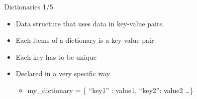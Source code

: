 \documentclass[
  8pt,
  ignorenonframetext,
]{beamer}
\providecommand{\tightlist}{%
  \setlength{\itemsep}{0pt}\setlength{\parskip}{0pt}}
\begin{document}
\begin{frame}{Dictionaries 1/5}
\protect\hypertarget{dictionaries-15}{}
\begin{itemize}[<+->]
\tightlist
\item
  Data structure that uses data in key-value pairs.
\end{itemize}

\begin{itemize}[<+->]
\tightlist
\item
  Each items of a dictionary is a key-value pair
\end{itemize}

\begin{itemize}[<+->]
\tightlist
\item
  Each key has to be unique
\end{itemize}

\begin{itemize}[<+->]
\tightlist
\item
  Declared in a very specific way

  \begin{itemize}[<+->]
  \tightlist
  \item
    my\_dictionary = \{ ``key1'' : value1, ``key2'': value2 \ldots\}
  \end{itemize}
\end{itemize}
\end{frame}
\end{document}
